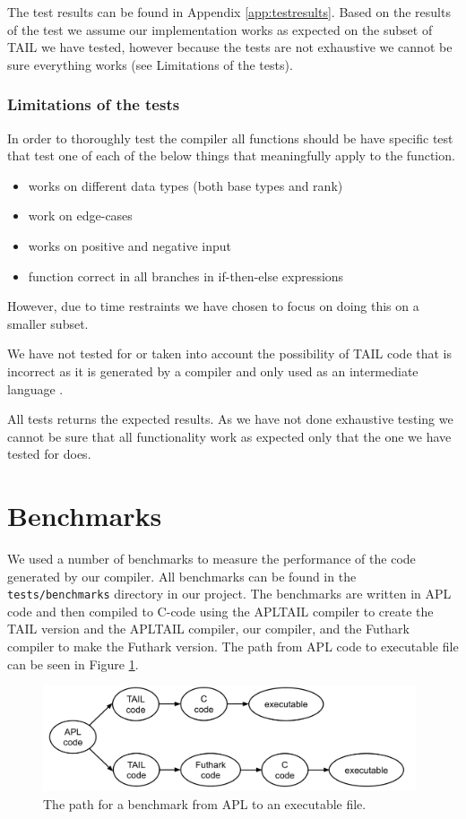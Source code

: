 \documentclass[11pt]{article}
\begin{document}
The test results can be found in Appendix \ref{app:testresults}. Based on the results of the test we assume our implementation works as expected on the subset of TAIL we have tested, however because the tests are not exhaustive we cannot be sure everything works (see Limitations of the tests).

\subsubsection{Limitations of the tests}
In order to thoroughly test the compiler all functions should be have specific test that test one of each of the below things
that meaningfully apply to the function. 
\begin{itemize}
\item works on different data types (both base types and rank)
\item work on edge-cases
\item works on positive and negative input
\item function correct in all branches in if-then-else expressions
\end{itemize}
However, due to time restraints we have chosen to focus on doing this on a smaller subset. 

We have not tested for or taken into account the possibility of TAIL code that is incorrect as it is generated by a compiler and only used as an intermediate language \cite{ElsmanDybdal:Array:2014}. 

All tests returns the expected results. 
As we have not done exhaustive testing we cannot be sure that all functionality work as expected only that the one we have tested for does. 

\section{Benchmarks}
\label{sec:benchmarks}
We used a number of benchmarks to measure the performance of the code generated by our compiler. 
All benchmarks can be found in the {\tt tests/benchmarks} directory in our project. 
The benchmarks are written in APL code and then compiled to C-code using the APLTAIL compiler to create the TAIL version and the APLTAIL compiler, our compiler, and the Futhark compiler to make the Futhark version.
The path from APL code to executable file can be seen in Figure \ref{fig:code}.

\begin{figure}[h]
\begin{center}
    \includegraphics[width=11cm]{code.png}
    \caption{The path for a benchmark from APL to an executable file.}
    \label{fig:code}
\end{center}
\end{figure}
\end{document}
